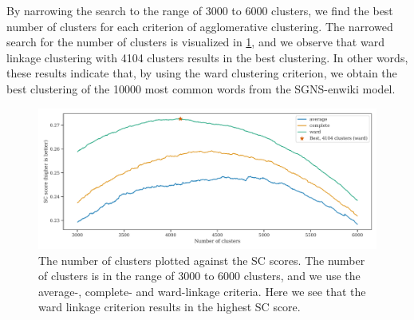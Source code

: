 By narrowing the search to the range of 3000 to 6000 clusters, we find the best number of clusters for each criterion of agglomerative clustering. The narrowed search for the number of clusters is visualized in \cref{fig:cluster-analysis-agglomerative-internal-cluster-validation-narrow}, and we observe that ward linkage clustering with 4104 clusters results in the best clustering. In other words, these results indicate that, by using the ward clustering criterion, we obtain the best clustering of the 10000 most common words from the SGNS-enwiki model.
\begin{figure}[H]
    \centering
    \includegraphics[width=\textwidth]{thesis/figures/cluster-analysis-agglomerative-internal-cluster-validation-narrow.pdf}
    \caption{The number of clusters plotted against the SC scores. The number of clusters is in the range of 3000 to 6000 clusters, and we use the average-, complete- and ward-linkage criteria. Here we see that the ward linkage criterion results in the highest SC score.}
    \label{fig:cluster-analysis-agglomerative-internal-cluster-validation-narrow}
\end{figure}

